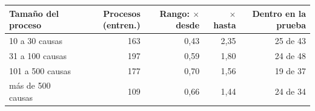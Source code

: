 \begin{tabular}{lrrrr}
\toprule
Tamaño del proceso & Procesos (entren.) & Rango: $\times$ desde & $\times$ hasta & Dentro en la prueba \\
\midrule
10 a 30 causas & 163 & 0,43 & 2,35 & 25 de 43 \\
31 a 100 causas & 197 & 0,59 & 1,80 & 24 de 48 \\
101 a 500 causas & 177 & 0,70 & 1,56 & 19 de 37 \\
más de 500 causas & 109 & 0,66 & 1,44 & 24 de 34 \\
\bottomrule
\end{tabular}
